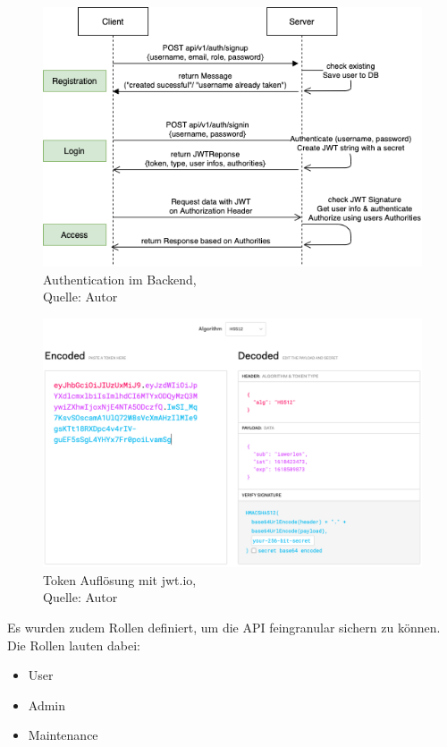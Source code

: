 \begin{figure}[H]
  	\centering
  	\includegraphics[scale=0.6]{images/Authentication.PNG}
  	\caption[Authentication im Backend]{Authentication im Backend,\\ Quelle: Autor}
  	\label{img: AuthenticationBackend}
\end{figure} 
\begin{figure}[H]
	\centering
	\includegraphics[scale=0.4]{images/jwtIO.PNG}
	\caption[Token Auflösung mit jwt.io]{Token Auflösung mit jwt.io,\\ Quelle: Autor}
	\label{img: jwtio}
\end{figure} 
\newpage
Es wurden zudem Rollen definiert, um die API feingranular sichern zu können. Die Rollen lauten dabei: 

\begin{itemize}
	\item User
	\item Admin
	\item Maintenance
\end{itemize}

